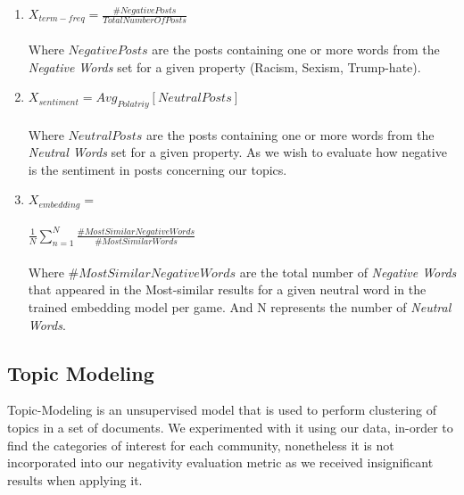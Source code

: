 \begin{enumerate}
    \item $X_{term-freq}= \frac{\#NegativePosts}{TotalNumberOfPosts}$\\\\
    Where $NegativePosts$ are the posts containing one or more words from the \emph{Negative Words} set for a given property (Racism, Sexism, Trump-hate).

    \item$X_{sentiment}=Avg_{Polatriy}[NeutralPosts]$\\\\
     Where $NeutralPosts$ are the posts containing one or more words from the \emph{Neutral Words} set for a given property. As we wish to evaluate how negative is the sentiment in posts concerning our topics.
    
    \item $X_{embedding}=$\\\\ $\frac{1}{N}\sum_{n=1}^{N}
    \frac{\#MostSimilarNegativeWords}{\#MostSimilarWords}$\\\\
    Where $\#MostSimilarNegativeWords$ are the total number of \emph{Negative Words} that appeared in the Most-similar results for a given neutral word in the trained embedding model per game. And N represents the number of \emph{Neutral Words}.
    
\end{enumerate}


\subsection{Topic Modeling}
Topic-Modeling \cite{wallach2006topic} is an unsupervised model that is used to perform clustering of topics in a set of documents. We experimented with it using our data, in-order to find the categories of interest for each community, nonetheless it is not incorporated into our negativity evaluation metric as we received insignificant results when applying it.

